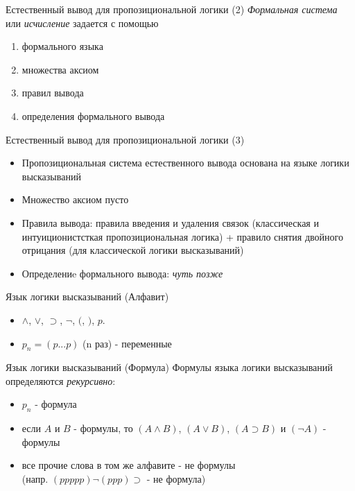 \documentclass{beamer}
\begin{document}
\begin{frame}{Естественный вывод для пропозициональной логики (2)}
\textit{Формальная система} или \textit{исчисление} задается с помощью
\begin{enumerate}
  \item формального языка
  \item множества аксиом
  \item правил вывода
  \item определения формального вывода
\end{enumerate}
\end{frame}

\begin{frame}{Естественный вывод для пропозициональной логики (3)}
\begin{itemize}
  \item Пропозициональная система естественного вывода основана на языке логики высказываний
  \item Множество аксиом пусто
  \item Правила вывода: правила введения и удаления связок (классическая и интуиционистсткая пропозициональная логика) + правило снятия двойного отрицания (для классической логики высказываний)
  \item Определениe формального вывода: \textit{чуть позже}
\end{itemize}
\end{frame}

\begin{frame}{Язык логики высказываний (Алфавит)}
\begin{itemize}
  \item $\land$, $\lor$, $\supset$, $\neg$, $($, $)$, $p$.
  \item $p_n = (p...p)$ (n раз) - переменные
\end{itemize}
\end{frame}

\begin{frame}{Язык логики высказываний (Формула)}
Формулы языка логики высказываний определяются \textit{рекурсивно}:
\begin{itemize}
  \item $p_n$ - формула
  \item если $A$ и $B$ - формулы, то $(A \land B)$, $(A \lor B)$, $(A \supset B)$ и $(\neg A)$ - формулы
  \item все прочие слова в том же алфавите - не формулы\\ (напр. $(ppppp) \neg (ppp) \supset$ - не формула)
\end{itemize}
\end{frame}
\end{document}
